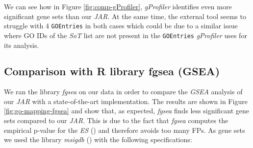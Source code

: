\documentclass[12pt]{article}
\begin{document}
We can see how in Figure \ref{fig:comp-gProfiler}, \textit{gProfiler} identifies even more 
significant gene sets than our \textit{JAR}.
At the same time, the external tool seems to struggle with 4 \texttt{GOEntries} in both cases
which could be due to a similar issue where GO IDs of the \textit{SoT} list are not
present in the \texttt{GOEntries} \textit{gProfiler} uses for its analysis.
\newpage

\subsection{Comparison with R library fgsea (GSEA)}\label{sec:Comparison-of-GSEA}
We ran the library \textit{fgsea} on our data in order to compare the \textit{GSEA} analysis
of our \textit{JAR} with a state-of-the-art implementation.
The results are shown in Figure \ref{fig:go-mapping-fgsea} and show that, as expected,  \textit{fgsea}
finds less significant gene sets compared to our \textit{JAR}. This is due to the fact that
\textit{fgsea} computes the empirical p-value for the \textit{ES} (\cite{fgsea}) and therefore avoids too many
FPs. 
As gene sets we used the library \textit{msigdb} (\cite{msigdb2024}) with the following specifications:
\end{document}

